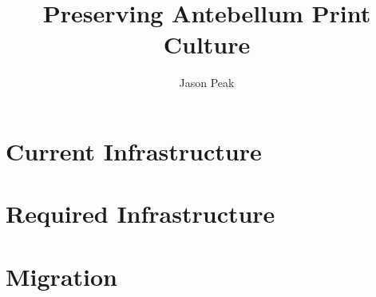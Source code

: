 \documentclass[oneside, 12pt]{article}
\begin{document}
\title{Preserving Antebellum Print Culture}
\author{Jason Peak}

\maketitle



\def\projectname{Poe's Magazine World}
\def\apc{Antebellum Print Culture}
\def\bwj{\emph{The Broadway Journal}}
\def\slm{\emph{Southern Literary Messenger}}
\def\bgm{\emph{Burton's Gentleman's Magazine}}
\def\gm{\emph{Graham's Magazine}}
\def\maglist{\bgm, \bwj, \gm, and the \slm}

\def\needcite{[citation]}
\def\needswork{[needs much work for inclusion]}

\begin{abstract}
  \begin{singlespace}
    
  \end{singlespace}
\end{abstract}

%

%




%
\section{Current Infrastructure}


\section{Required Infrastructure}



\section{Migration}

\end{document}
